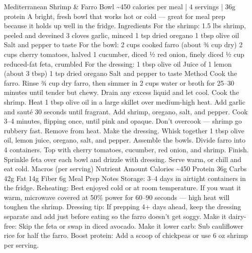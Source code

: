 Mediterranean Shrimp \& Farro Bowl \~{}450 calories per meal | 4 servings | 36g protein A bright, fresh bowl that works hot or cold — great for meal prep because it holds up well in the fridge. Ingredients For the shrimp: 1.5 lbs shrimp, peeled and deveined 3 cloves garlic, minced 1 tsp dried oregano 1 tbsp olive oil Salt and pepper to taste For the bowl: 2 cups cooked farro (about ¾ cup dry) 2 cups cherry tomatoes, halved 1 cucumber, diced ½ red onion, finely diced ½ cup reduced-fat feta, crumbled For the dressing: 1 tbsp olive oil Juice of 1 lemon (about 3 tbsp) 1 tsp dried oregano Salt and pepper to taste Method Cook the farro. Rinse ¾ cup dry farro, then simmer in 2 cups water or broth for 25–30 minutes until tender but chewy. Drain any excess liquid and let cool. Cook the shrimp. Heat 1 tbsp olive oil in a large skillet over medium-high heat. Add garlic and sauté 30 seconds until fragrant. Add shrimp, oregano, salt, and pepper. Cook 3–4 minutes, flipping once, until pink and opaque. Don't overcook — shrimp go rubbery fast. Remove from heat. Make the dressing. Whisk together 1 tbsp olive oil, lemon juice, oregano, salt, and pepper. Assemble the bowls. Divide farro into 4 containers. Top with cherry tomatoes, cucumber, red onion, and shrimp. Finish. Sprinkle feta over each bowl and drizzle with dressing. Serve warm, or chill and eat cold. Macros (per serving) Nutrient Amount Calories \~{}450 Protein 36g Carbs 42g Fat 14g Fiber 6g Meal Prep Notes Storage: 3–4 days in airtight containers in the fridge. Reheating: Best enjoyed cold or at room temperature. If you want it warm, microwave covered at 50\% power for 60–90 seconds — high heat will toughen the shrimp. Dressing tip: If prepping 4+ days ahead, keep the dressing separate and add just before eating so the farro doesn't get soggy. Make it dairy-free: Skip the feta or swap in diced avocado. Make it lower carb: Sub cauliflower rice for half the farro. Boost protein: Add a scoop of chickpeas or use 6 oz shrimp per serving.
\par


